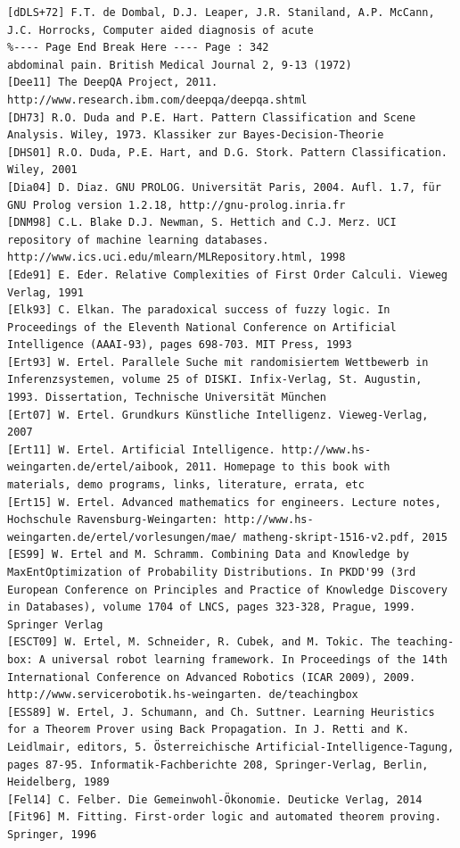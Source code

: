 \documentclass[10pt]{article}
\begin{document}
\begin{verbatim}
[dDLS+72] F.T. de Dombal, D.J. Leaper, J.R. Staniland, A.P. McCann, J.C. Horrocks, Computer aided diagnosis of acute 
%---- Page End Break Here ---- Page : 342
abdominal pain. British Medical Journal 2, 9-13 (1972)
[Dee11] The DeepQA Project, 2011. http://www.research.ibm.com/deepqa/deepqa.shtml
[DH73] R.O. Duda and P.E. Hart. Pattern Classification and Scene Analysis. Wiley, 1973. Klassiker zur Bayes-Decision-Theorie
[DHS01] R.O. Duda, P.E. Hart, and D.G. Stork. Pattern Classification. Wiley, 2001
[Dia04] D. Diaz. GNU PROLOG. Universität Paris, 2004. Aufl. 1.7, für GNU Prolog version 1.2.18, http://gnu-prolog.inria.fr
[DNM98] C.L. Blake D.J. Newman, S. Hettich and C.J. Merz. UCI repository of machine learning databases. http://www.ics.uci.edu/mlearn/MLRepository.html, 1998
[Ede91] E. Eder. Relative Complexities of First Order Calculi. Vieweg Verlag, 1991
[Elk93] C. Elkan. The paradoxical success of fuzzy logic. In Proceedings of the Eleventh National Conference on Artificial Intelligence (AAAI-93), pages 698-703. MIT Press, 1993
[Ert93] W. Ertel. Parallele Suche mit randomisiertem Wettbewerb in Inferenzsystemen, volume 25 of DISKI. Infix-Verlag, St. Augustin, 1993. Dissertation, Technische Universität München
[Ert07] W. Ertel. Grundkurs Künstliche Intelligenz. Vieweg-Verlag, 2007
[Ert11] W. Ertel. Artificial Intelligence. http://www.hs-weingarten.de/ertel/aibook, 2011. Homepage to this book with materials, demo programs, links, literature, errata, etc
[Ert15] W. Ertel. Advanced mathematics for engineers. Lecture notes, Hochschule Ravensburg-Weingarten: http://www.hs-weingarten.de/ertel/vorlesungen/mae/ matheng-skript-1516-v2.pdf, 2015
[ES99] W. Ertel and M. Schramm. Combining Data and Knowledge by MaxEntOptimization of Probability Distributions. In PKDD'99 (3rd European Conference on Principles and Practice of Knowledge Discovery in Databases), volume 1704 of LNCS, pages 323-328, Prague, 1999. Springer Verlag
[ESCT09] W. Ertel, M. Schneider, R. Cubek, and M. Tokic. The teaching-box: A universal robot learning framework. In Proceedings of the 14th International Conference on Advanced Robotics (ICAR 2009), 2009. http://www.servicerobotik.hs-weingarten. de/teachingbox
[ESS89] W. Ertel, J. Schumann, and Ch. Suttner. Learning Heuristics for a Theorem Prover using Back Propagation. In J. Retti and K. Leidlmair, editors, 5. Österreichische Artificial-Intelligence-Tagung, pages 87-95. Informatik-Fachberichte 208, Springer-Verlag, Berlin, Heidelberg, 1989
[Fel14] C. Felber. Die Gemeinwohl-Ökonomie. Deuticke Verlag, 2014
[Fit96] M. Fitting. First-order logic and automated theorem proving. Springer, 1996

\end{verbatim}
\end{document}
